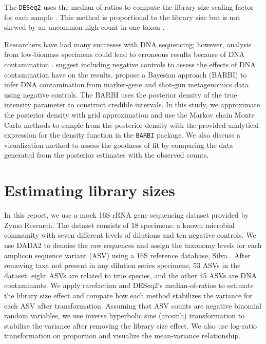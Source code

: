 \documentclass[12pt]{article}
\begin{document}
The \texttt{DESeq2} uses the median-of-ratios to compute the library size scaling factor for each sample \citep{anders2010differential} . This method is proportional to the library size but is not skewed by an uncommon high count in one taxon \citep{love2014moderated}.

Researchers have had many successes with DNA sequencing; however, analysis from low-biomass specimens could lead to erroneous results because of DNA contamination \citep{salter2014reagent}. \cite{salter2014reagent} suggest including negative controls to assess the effects of DNA contamination have on the results. \cite{cheng2019combined} propose a Bayesian approach (BARBI) to infer DNA contamination from marker-gene and shot-gun metagenomics data using negative controls. The BARBI uses the posterior density of the true intensity parameter to construct credible intervals. In this study, we approximate the posterior density with grid approximation and use the Markov chain Monte Carlo methods to sample from the posterior density with the provided analytical expression for the density function in the \texttt{BARBI} package. We also discuss a visualization method to  assess the goodness of fit by comparing the data generated from the posterior estimates with the observed counts.

	

\section{Estimating library sizes}

In this report, we use a mock 16S rRNA gene sequencing dataset provided by Zymo Research. The dataset consists of 18 specimens: a known microbial community with seven different levels of dilutions and ten negative controls. We use DADA2 to denoise the raw sequences and assign the taxonomy levels for each amplicon sequence variant (ASV) using a 16S reference database, Silva \citep{callahan2016dada2}. After removing taxa not present in any dilution series specimens, 53 ASVs in the dataset: eight ASVs are related to true species, and the other 45 ASVs are DNA contaminants. We apply rarefaction and DESeq2’s median-of-ratios to estimate the library size effect and compare how each method stabilizes the variance for each ASV after transformation. Assuming that ASV counts are negative binomial random variables, we use inverse hyperbolic sine (arcsinh) transformation to stabilize the variance after removing the library size effect. We also use log-ratio transformation on proportion and visualize the mean-variance relationship. 
\end{document}
